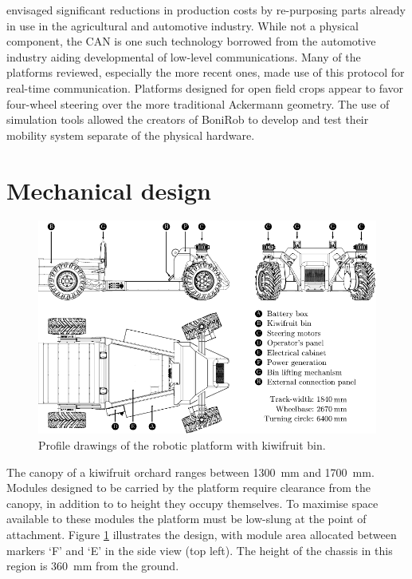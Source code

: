 \documentclass[preprint,authoryear,12pt]{elsarticle}
\begin{document}
    \cite{Blackmore2007} envisaged significant reductions in production costs by re-purposing parts already in use in the agricultural and automotive industry.
    While not a physical component, the CAN is one such technology borrowed from the automotive industry aiding developmental of low-level communications.
    Many of the platforms reviewed, especially the more recent ones, made use of this protocol for real-time communication.
    Platforms designed for open field crops appear to favor four-wheel steering over the more traditional Ackermann geometry.
    The use of simulation tools allowed the creators of BoniRob to develop and test their mobility system separate of the physical hardware.


\section{Mechanical design}
\label{sect:mechanical}

    \begin{figure}[htb]
        \centering
        \includegraphics[width=\linewidth]{imgs/profile_views/AMMP-All-Labelled.pdf}
        \caption{Profile drawings of the robotic platform with kiwifruit bin.}
        \label{fig:AMMP}
    \end{figure}

    The canopy of a kiwifruit orchard ranges between \SI{1300}{\milli\meter} and \SI{1700}{\milli\meter}.
    Modules designed to be carried by the platform require clearance from the canopy, in addition to to height they occupy themselves.
    To maximise space available to these modules the platform must be low-slung at the point of attachment.
    Figure \ref{fig:AMMP} illustrates the design, with module area allocated between markers `F' and `E' in the side view (top left).
    The height of the chassis in this region is \SI{360}{\milli\meter} from the ground.
\end{document}
